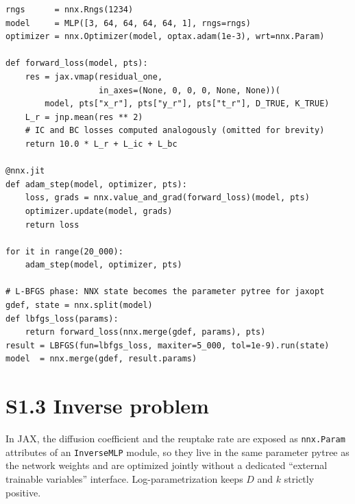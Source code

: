 \documentclass[12pt]{article}
\begin{document}
\begin{verbatim}
rngs      = nnx.Rngs(1234)
model     = MLP([3, 64, 64, 64, 64, 1], rngs=rngs)
optimizer = nnx.Optimizer(model, optax.adam(1e-3), wrt=nnx.Param)

def forward_loss(model, pts):
    res = jax.vmap(residual_one,
                   in_axes=(None, 0, 0, 0, None, None))(
        model, pts["x_r"], pts["y_r"], pts["t_r"], D_TRUE, K_TRUE)
    L_r = jnp.mean(res ** 2)
    # IC and BC losses computed analogously (omitted for brevity)
    return 10.0 * L_r + L_ic + L_bc

@nnx.jit
def adam_step(model, optimizer, pts):
    loss, grads = nnx.value_and_grad(forward_loss)(model, pts)
    optimizer.update(model, grads)
    return loss

for it in range(20_000):
    adam_step(model, optimizer, pts)

# L-BFGS phase: NNX state becomes the parameter pytree for jaxopt
gdef, state = nnx.split(model)
def lbfgs_loss(params):
    return forward_loss(nnx.merge(gdef, params), pts)
result = LBFGS(fun=lbfgs_loss, maxiter=5_000, tol=1e-9).run(state)
model  = nnx.merge(gdef, result.params)
\end{verbatim}

\section*{S1.3 Inverse problem}

In JAX, the diffusion coefficient and the reuptake rate are
exposed as \texttt{nnx.Param} attributes of an
\texttt{InverseMLP} module, so they live in the same parameter
pytree as the network weights and are optimized jointly without
a dedicated ``external trainable variables'' interface.
Log-parametrization keeps $D$ and $k$ strictly positive.
\end{document}
